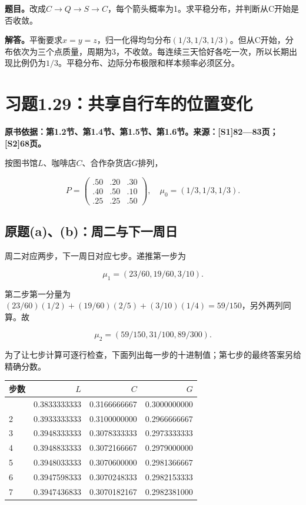 \documentclass[
  11pt,
  a4paper,
  UTF8,
  fontset=fandol]{ctexart}
\begin{document}
\textbf{题目。}改成\(C\to Q\to S\to C\)，每个箭头概率为1。求平稳分布，并判断从C开始是否收敛。

\textbf{解答。}平衡要求\(x=y=z\)，归一化得均匀分布\((1/3,1/3,1/3)\)。但从C开始，分布依次为三个点质量，周期为3，不收敛。每连续三天恰好各吃一次，所以长期出现比例仍为\(1/3\)。平稳分布、边际分布极限和样本频率必须区分。

\section{习题1.29：共享自行车的位置变化}\label{ux4e60ux98981.29ux5171ux4eabux81eaux884cux8f66ux7684ux4f4dux7f6eux53d8ux5316}

\textbf{原书依据：第1.2节、第1.4节、第1.5节、第1.6节。来源：{[}S1{]}82---83页；{[}S2{]}68页。}

按图书馆\(L\)、咖啡店\(C\)、合作杂货店\(G\)排列，

\[
P=\begin{pmatrix}.50&.20&.30\\.40&.50&.10\\.25&.25&.50\end{pmatrix},
\quad\mu_0=(1/3,1/3,1/3).
\]

\subsection{原题(a)、(b)：周二与下一周日}\label{ux539fux9898abux5468ux4e8cux4e0eux4e0bux4e00ux5468ux65e5}

周二对应两步，下一周日对应七步。递推第一步为

\[
\mu_1=(23/60,19/60,3/10).
\]

第二步第一分量为\((23/60)(1/2)+(19/60)(2/5)+(3/10)(1/4)=59/150\)，另外两列同算。故

\[
\boxed{\mu_2=(59/150,31/100,89/300).}
\]

为了让七步计算可逐行检查，下面列出每一步的十进制值；第七步的最终答案另给精确分数。

\begin{longtable}[]{@{}lrrr@{}}
\toprule\noalign{}
步数 & \(L\) & \(C\) & \(G\) \\
\midrule\noalign{}
\endhead
\bottomrule\noalign{}
\endlastfoot
1 & 0.3833333333 & 0.3166666667 & 0.3000000000 \\
2 & 0.3933333333 & 0.3100000000 & 0.2966666667 \\
3 & 0.3948333333 & 0.3078333333 & 0.2973333333 \\
4 & 0.3948833333 & 0.3072166667 & 0.2979000000 \\
5 & 0.3948033333 & 0.3070600000 & 0.2981366667 \\
6 & 0.3947598333 & 0.3070248333 & 0.2982153333 \\
7 & 0.3947436833 & 0.3070182167 & 0.2982381000 \\
\end{longtable}
\end{document}
